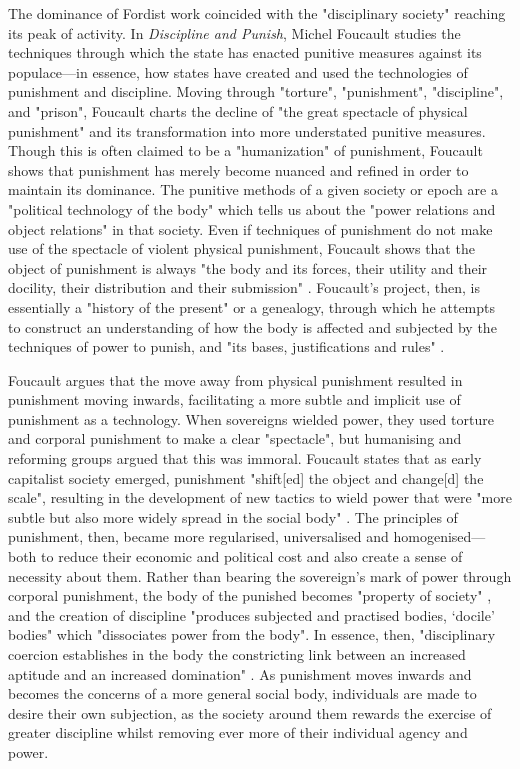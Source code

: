 The dominance of Fordist work coincided with the "disciplinary society" reaching its peak of activity. In \emph{Discipline and Punish}, Michel Foucault studies the techniques through which the state has enacted punitive measures against its populace—in essence, how states have created and used the technologies of punishment and discipline. Moving through "torture", "punishment", "discipline", and "prison", Foucault charts the decline of "the great spectacle of physical punishment" \citeyearpar[p. 14]{foucault_discipline_1977} and its transformation into more understated punitive measures. Though this is often claimed to be a "humanization" \citeyearpar[p. 7]{foucault_discipline_1977} of punishment, Foucault shows that punishment has merely become nuanced and refined in order to maintain its dominance. The punitive methods of a given society or epoch are a "political technology of the body" which tells us about the "power relations and object relations" \citeyearpar[p. 24]{foucault_discipline_1977} in that society. Even if techniques of punishment do not make use of the spectacle of violent physical punishment, Foucault shows that the object of punishment is always "the body and its forces, their utility and their docility, their distribution and their submission" \citeyearpar[p. 25]{foucault_discipline_1977}. Foucault's project, then, is essentially a "history of the present" \citeyearpar[p. 31]{foucault_discipline_1977} or a genealogy, through which he attempts to construct an understanding of how the body is affected and subjected by the techniques of power to punish, and "its bases, justifications and rules" \citeyearpar[p. 23]{foucault_discipline_1977}.

Foucault argues that the move away from physical punishment resulted in punishment moving inwards, facilitating a more subtle and implicit use of punishment as a technology. When sovereigns wielded power, they used torture and corporal punishment to make a clear "spectacle", but humanising and reforming groups argued that this was immoral. Foucault states that as early capitalist society emerged, punishment "shift[ed] the object and change[d] the scale", resulting in the development of new tactics to wield power that were "more subtle but also more widely spread in the social body" \citeyearpar[p. 89]{foucault_discipline_1977}. The principles of punishment, then, became more regularised, universalised and homogenised—both to reduce their economic and political cost and also create a sense of necessity about them. Rather than bearing the sovereign's mark of power through corporal punishment, the body of the punished becomes "property of society" \citeyearpar[p. 109]{foucault_discipline_1977}, and the creation of discipline "produces subjected and practised bodies, `docile' bodies" which "dissociates power from the body". In essence, then, "disciplinary coercion establishes in the body the constricting link between an increased aptitude and an increased domination" \citeyearpar[p. 138]{foucault_discipline_1977}. As punishment moves inwards and becomes the concerns of a more general social body, individuals are made to desire their own subjection, as the society around them rewards the exercise of greater discipline whilst removing ever more of their individual agency and power.

